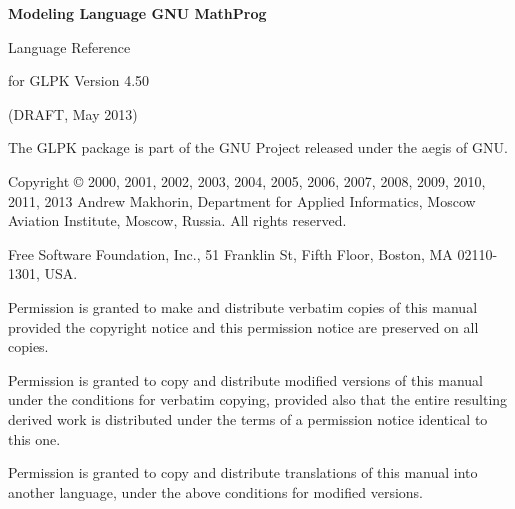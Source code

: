 \documentclass[11pt]{report}
\begin{document}
\thispagestyle{empty}

\begin{center}

\vspace*{1.5in}

\begin{huge}
\sf\bfseries Modeling Language GNU MathProg
\end{huge}

\vspace{0.5in}

\begin{LARGE}
\sf Language Reference
\end{LARGE}

\vspace{0.5in}

\begin{LARGE}
\sf for GLPK Version 4.50
\end{LARGE}

\vspace{0.5in}
\begin{Large}
\sf (DRAFT, May 2013)
\end{Large}

\end{center}

\newpage

\vspace*{1in}

\vfill

\noindent
The GLPK package is part of the GNU Project released under the aegis of
GNU.

\noindent
Copyright \copyright{} 2000, 2001, 2002, 2003, 2004, 2005, 2006, 2007,
2008, 2009, 2010, 2011, 2013 Andrew Makhorin, Department for Applied
Informatics, Moscow Aviation Institute, Moscow, Russia. All rights
reserved.

\noindent
Free Software Foundation, Inc., 51 Franklin St, Fifth Floor, Boston,
MA 02110-1301, USA.

\noindent
Permission is granted to make and distribute verbatim copies of this
manual provided the copyright notice and this permission notice are
preserved on all copies.

\noindent
Permission is granted to copy and distribute modified versions of this
manual under the conditions for verbatim copying, provided also that
the entire resulting derived work is distributed under the terms of
a permission notice identical to this one.

\noindent
Permission is granted to copy and distribute translations of this
manual into another language, under the above conditions for modified
versions.
\end{document}
